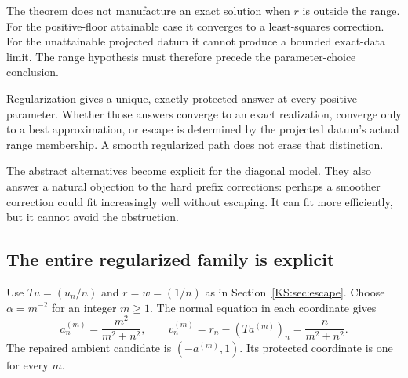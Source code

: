The theorem does not manufacture an exact solution when $r$ is outside the range. For the positive-floor attainable case it converges to a least-squares correction. For the unattainable projected datum it cannot produce a bounded exact-data limit. The range hypothesis must therefore precede the parameter-choice conclusion.


\begin{insight}
Regularization gives a unique, exactly protected answer at every positive parameter. Whether those answers converge to an exact realization, converge only to a best approximation, or escape is determined by the projected datum's actual range membership. A smooth regularized path does not erase that distinction.
\end{insight}



\label{KS:sec:diagonal-regularization}
The abstract alternatives become explicit for the diagonal model. They also answer a natural objection to the hard prefix corrections: perhaps a smoother correction could fit increasingly well without escaping. It can fit more efficiently, but it cannot avoid the obstruction.

\subsection{The entire regularized family is explicit}
Use $Tu=(u_n/n)$ and $r=w=(1/n)$ as in Section~\ref{KS:sec:escape}. Choose $\alpha=m^{-2}$ for an integer $m\ge1$. The normal equation in each coordinate gives
\[
 a^{(m)}_n=\frac{m^2}{m^2+n^2},\qquad
 v^{(m)}_n=r_n-(Ta^{(m)})_n=\frac{n}{m^2+n^2}.
\]
The repaired ambient candidate is $(-a^{(m)},1)$. Its protected coordinate is one for every $m$.

